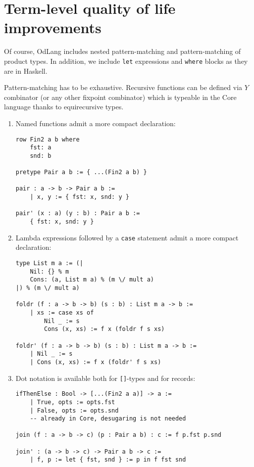 \documentclass[a4paper,14pt]{extreport}
\begin{document}
\section{Term-level quality of life improvements}

Of course, OdLang includes nested pattern-matching and pattern-matching of
product types. In addition, we include \verb|let| expressions and \verb|where|
blocks as they are in Haskell.

Pattern-matching has to be exhaustive. Recursive functions can be defined via
$Y$ combinator (or any other fixpoint combinator) which is typeable in the Core
language thanks to equirecursive types.

\begin{enumerate}
    \item Named functions admit a more compact declaration:
\begin{verbatim}
row Fin2 a b where
    fst: a
    snd: b

pretype Pair a b := { ...(Fin2 a b) }

pair : a -> b -> Pair a b :=
    | x, y := { fst: x, snd: y }

pair' (x : a) (y : b) : Pair a b :=
    { fst: x, snd: y }
\end{verbatim}
    \item Lambda expressions followed by a \verb|case| statement admit a more
        compact declaration:
\begin{verbatim}
type List m a := (|
    Nil: {} % m
    Cons: (a, List m a) % (m \/ mult a)
|) % (m \/ mult a)

foldr (f : a -> b -> b) (s : b) : List m a -> b :=
    | xs := case xs of
        Nil _ := s
        Cons (x, xs) := f x (foldr f s xs)

foldr' (f : a -> b -> b) (s : b) : List m a -> b :=
    | Nil _ := s
    | Cons (x, xs) := f x (foldr' f s xs)
\end{verbatim}
    \item Dot notation is available both for \verb|[]|-types and for records:
\begin{verbatim}
ifThenElse : Bool -> [...(Fin2 a a)] -> a :=
    | True, opts := opts.fst
    | False, opts := opts.snd
    -- already in Core, desugaring is not needed

join (f : a -> b -> c) (p : Pair a b) : c := f p.fst p.snd

join' : (a -> b -> c) -> Pair a b -> c :=
    | f, p := let { fst, snd } := p in f fst snd
\end{verbatim}
\end{enumerate}
\end{document}
